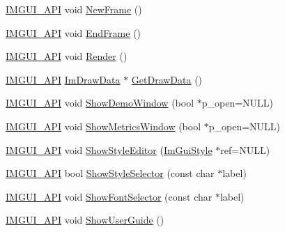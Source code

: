 \begin{DoxyCompactItemize}
\item 
\mbox{\hyperlink{imgui_8h_a43829975e84e45d1149597467a14bbf5}{I\+M\+G\+U\+I\+\_\+\+A\+PI}} void \mbox{\hyperlink{namespace_im_gui_ab3f1fc018f903b7ad79fd10663375774}{New\+Frame}} ()
\item 
\mbox{\hyperlink{imgui_8h_a43829975e84e45d1149597467a14bbf5}{I\+M\+G\+U\+I\+\_\+\+A\+PI}} void \mbox{\hyperlink{namespace_im_gui_a246c37da45e88a12ade440a0feacb4ee}{End\+Frame}} ()
\item 
\mbox{\hyperlink{imgui_8h_a43829975e84e45d1149597467a14bbf5}{I\+M\+G\+U\+I\+\_\+\+A\+PI}} void \mbox{\hyperlink{namespace_im_gui_ab51a164f547317c16c441f1599e3946d}{Render}} ()
\item 
\mbox{\hyperlink{imgui_8h_a43829975e84e45d1149597467a14bbf5}{I\+M\+G\+U\+I\+\_\+\+A\+PI}} \mbox{\hyperlink{struct_im_draw_data}{Im\+Draw\+Data}} $\ast$ \mbox{\hyperlink{namespace_im_gui_ab73131dc44b1267dac04f0c2bb0af983}{Get\+Draw\+Data}} ()
\item 
\mbox{\hyperlink{imgui_8h_a43829975e84e45d1149597467a14bbf5}{I\+M\+G\+U\+I\+\_\+\+A\+PI}} void \mbox{\hyperlink{namespace_im_gui_af95643a0ce4893b9e57c12991922fb18}{Show\+Demo\+Window}} (bool $\ast$p\+\_\+open=N\+U\+LL)
\item 
\mbox{\hyperlink{imgui_8h_a43829975e84e45d1149597467a14bbf5}{I\+M\+G\+U\+I\+\_\+\+A\+PI}} void \mbox{\hyperlink{namespace_im_gui_afe7a28c6eb52fff3cc27d5a698fea4ff}{Show\+Metrics\+Window}} (bool $\ast$p\+\_\+open=N\+U\+LL)
\item 
\mbox{\hyperlink{imgui_8h_a43829975e84e45d1149597467a14bbf5}{I\+M\+G\+U\+I\+\_\+\+A\+PI}} void \mbox{\hyperlink{namespace_im_gui_ab2eb3dec78d054fe3feab1c091ec5de5}{Show\+Style\+Editor}} (\mbox{\hyperlink{struct_im_gui_style}{Im\+Gui\+Style}} $\ast$ref=N\+U\+LL)
\item 
\mbox{\hyperlink{imgui_8h_a43829975e84e45d1149597467a14bbf5}{I\+M\+G\+U\+I\+\_\+\+A\+PI}} bool \mbox{\hyperlink{namespace_im_gui_a83f4e863c102b0a05e0e3308b371b394}{Show\+Style\+Selector}} (const char $\ast$label)
\item 
\mbox{\hyperlink{imgui_8h_a43829975e84e45d1149597467a14bbf5}{I\+M\+G\+U\+I\+\_\+\+A\+PI}} void \mbox{\hyperlink{namespace_im_gui_a0bdce99eef17ef1e1fef40a18bd811ab}{Show\+Font\+Selector}} (const char $\ast$label)
\item 
\mbox{\hyperlink{imgui_8h_a43829975e84e45d1149597467a14bbf5}{I\+M\+G\+U\+I\+\_\+\+A\+PI}} void \mbox{\hyperlink{namespace_im_gui_ad6f4919bc9aa806ca8d2c1d6e2bfb051}{Show\+User\+Guide}} ()
\item 

\end{DoxyCompactItemize}
